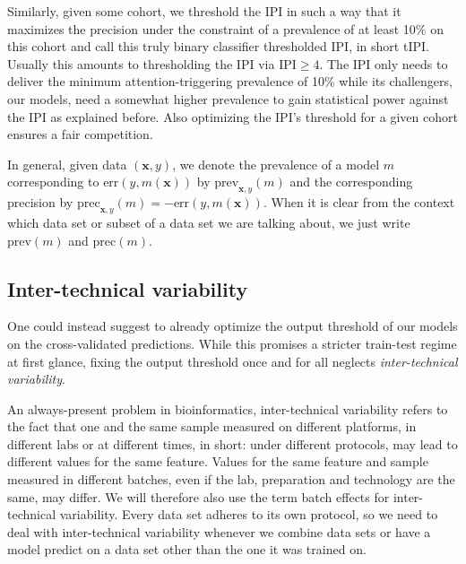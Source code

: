 Similarly, given some cohort, we threshold the IPI in such a way that it maximizes the precision under 
the constraint of a prevalence of at least \num{10}\% on this cohort and call this truly 
binary classifier thresholded IPI, in short tIPI. Usually this amounts to thresholding the IPI via 
$\text{IPI} \geq 4$. The IPI only needs to deliver the minimum 
attention-triggering prevalence of \num{10}\% while its challengers, our models, need a somewhat 
higher prevalence to gain statistical power against the IPI as explained before. Also optimizing 
the IPI's threshold for a given cohort ensures a fair competition.

In general, given data $(\mathbf{x}, y)$, we denote the prevalence of a model $m$ corresponding to 
$\text{err}(y, m(\textbf{x}))$ by $\text{prev}_{\mathbf{x}, y}(m)$ and the corresponding precision 
by $\text{prec}_{\mathbf{x}, y}(m) = -\text{err}(y, m(\textbf{x}))$. When it is clear from the 
context which data set or subset of a data set we are talking about, we just write $\text{prev}(m)$ 
and $\text{prec}(m)$.

\subsection{Inter-technical variability} 
One could instead suggest to already optimize the output threshold of our models on the cross-validated 
predictions. While this promises a stricter train-test regime at first glance, fixing the output 
threshold once and for all neglects \textit{inter-technical variability}. 

An always-present problem in bioinformatics, inter-technical variability refers to the fact that 
one and the same sample measured on different platforms, in different labs or at different times, 
in short: under different protocols, may lead to different values for the same feature. 
Values for the same feature and sample measured in different batches, even if the lab, preparation 
and technology are the same, may differ. We will therefore also use the term batch effects for 
inter-technical variability. Every data set adheres to its own protocol, so we need to deal with 
inter-technical variability whenever we combine data sets or have a model predict on a data set 
other than the one it was trained on.

